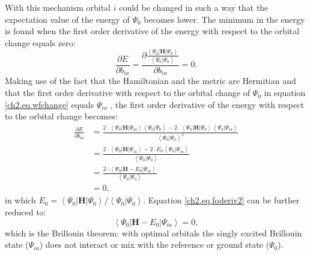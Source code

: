 With this mechanism orbital $i$ could be changed in such a way that the expectation value of the energy of $\Psi_0$ becomes lower. The minimum in the energy is found when the first order derivative of the energy with respect to the orbital change equals zero:
\begin{equation}
\frac{\partial E}{\partial b_{ia}}=\frac{\partial \frac{\left < \Psi_0 | \mathbf{H} | \Psi_0 \right >}{\left < \Psi_0 | \Psi_0 \right >}}{\partial b_{ia}}=0.
\label{ch2.eq.foderiv}
\end{equation}
Making use of the fact that the Hamiltonian and the metric are Hermitian and that the first order derivative with respect to the orbital change of $\Psi_0$ in equation \ref{ch2.eq.wfchange} equals $\Psi_{ia}$ \cite{vbscf2}, the first order derivative of the energy with respect to the orbital change becomes: 
\begin{equation}
\begin{split}
\frac{\partial E}{\partial b_{ia}} & = \frac{2 \cdot \left < \Psi_0 | \mathbf{H} | \Psi_{ia} \right > \left< \Psi_0 | \Psi_0 \right > - 2 \cdot \left < \Psi_0 | \mathbf{H} | \Psi_0  \right > \left< \Psi_0 | \Psi_{ia}\right>}{\left < \Psi_0 | \Psi_0 \right > ^2 }\\
& = \frac{ 2 \cdot \left < \Psi_0 | \mathbf{H} | \Psi_{ia} \right > - 2 \cdot E_0 \left< \Psi_0 | \Psi_{ia} \right >}{\left < \Psi_0 | \Psi_0 \right >}\\
& = \frac{ 2 \cdot \left < \Psi_0 | \mathbf{H} -E_0 | \Psi_{ia} \right >}{\left < \Psi_0 | \Psi_0 \right >}\\
& = 0,
\end{split}
\label{ch2.eq.foderiv2}
\end{equation}
in which $E_0 = \left < \Psi_0 | \mathbf{H} | \Psi_0 \right > / \left < \Psi_0 | \Psi_0 \right >$. Equation \ref{ch2.eq.foderiv2} can be further reduced to:
\begin{equation}
\left < \Psi_0 | \mathbf{H} - E_0 | \Psi_{ia} \right > = 0,
\label{ch2.eq.brillouin}
\end{equation}
which is the Brillouin theorem: with optimal orbitals the singly excited Brillouin state ($\Psi_{ia}$) does not interact or mix with the reference or ground state ($\Psi_0$). 

